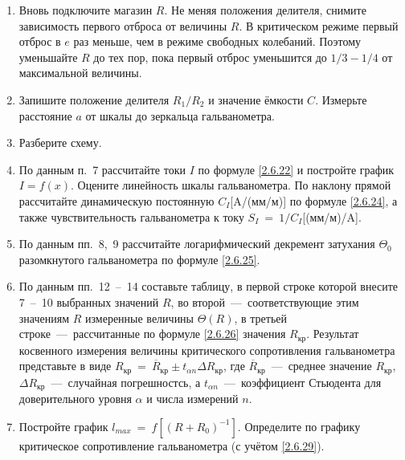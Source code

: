 \begin{lab:task}
\begin{enumerate}
Подберите делитель так, чтобы при замыкании ключа
$K_0$ первый отброс $l_{max}$ соответствовал отклонению
зайчика почти на всю шкалу.

	\item Вновь подключите магазин $R$. Не меняя положения делителя,
снимите зависимость первого отброса от величины $R$. В критическом
режиме первый отброс в $e$ раз меньше, чем в режиме свободных
колебаний. Поэтому уменьшайте $R$ до тех пор, пока первый отброс
уменьшится до $1/3-1/4$ от максимальной величины.

	\item Запишите положение делителя
$R_1/R_2$ и значение ёмкости
$C$. Измерьте расстояние $a$ от шкалы до зеркальца
гальванометра.

	\item Разберите схему.


	\item По данным п.~7 рассчитайте токи $I$ по формуле \eqref{2.6.22} и постройте
график $I=f(x)$. Оцените линейность шкалы гальванометра. По наклону
прямой рассчитайте динамическую постоянную $C_I$[A/(мм/м)] по формуле
\eqref{2.6.24}, а также чувствительность гальванометра к току $S_I~=~1/C_I$[(мм/м)/A].

	\item По данным пп.~8,~9 рассчитайте логарифмический декремент затухания $\Theta_0$
разомкнутого гальванометра по формуле \eqref{2.6.25}.

	\item По данным пп.~12~--~14 составьте таблицу, в первой строке которой
внесите 7~--~10 выбранных значений $R$, во второй~---~соответствующие
этим значениям $R$ измеренные величины $\Theta(R)$, в третьей строке~---~рассчитанные по формуле \eqref{2.6.26} значения $R_{\text{кр}}$. Результат косвенного измерения
величины критического сопротивления гальванометра представьте в виде $R_{\text{кр}}~=~\overline R_{\text{кр}}\pm t_{\alpha n}\Delta R_{\text{кр}}$,
где $\overline R_{\text{кр}}$~---~среднее значение $R_{\text{кр}}$, $\Delta R_{\text{кр}}$~---~случайная погрешностсь, а $t_{\alpha n}$~---~коэффициент
Стьюдента для доверительного уровня $\alpha$ и числа измерений $n$.

	\item Постройте график $l_{max}~=~f \left [(R + R_0)^{-1} \right]$. Определите по графику критическое сопротивление
гальванометра (с учётом \eqref{2.6.29}).


\end{enumerate}
\end{lab:task}
